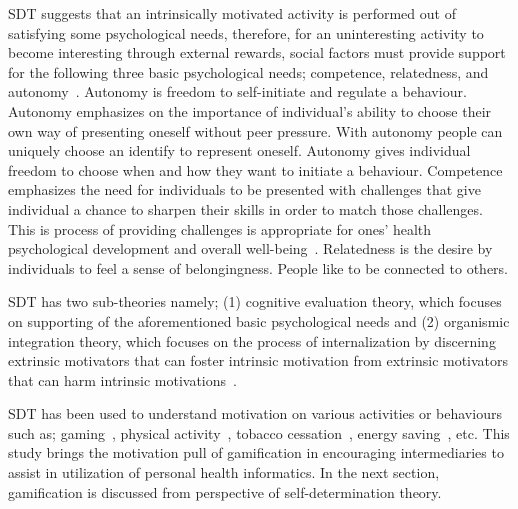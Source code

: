 SDT suggests that an intrinsically motivated activity is performed out of satisfying some psychological needs, therefore, for an uninteresting activity to become interesting through external rewards, social factors must provide support for the following three basic psychological needs; competence, relatedness, and autonomy~\citep{ryan2000intrinsic}. Autonomy is freedom to self-initiate and regulate a behaviour. Autonomy emphasizes on the importance of individual's ability to choose their own way of presenting oneself without peer pressure. With autonomy people can uniquely choose an identify to represent oneself. Autonomy gives individual freedom to choose when and how they want to initiate a behaviour. Competence emphasizes the need for individuals to be presented with challenges that give individual a chance to sharpen their skills in order to match those challenges. This is process of providing challenges is appropriate for ones' health psychological development and  overall well-being~\citep{zhang2008motivational}. Relatedness is the desire by individuals to feel a sense of belongingness. People like to be connected to others.

SDT has two sub-theories namely; (1) cognitive evaluation theory, which focuses on supporting of the aforementioned basic psychological needs and (2) organismic integration theory, which focuses on the process of internalization by discerning extrinsic motivators that can foster intrinsic motivation from extrinsic motivators that can harm intrinsic motivations~\citep{ryan2000:self,lee2015:relating}.

SDT has been used to understand motivation on various activities or behaviours such as; gaming~\citep{ryan2006:motivationalpull}, physical activity~\citep{power2011:obesity}, tobacco cessation~\citep{williams2006:testing}, energy saving~\citep{webb2013:self}, etc. This study brings the motivation pull of gamification in encouraging intermediaries to assist in utilization of personal health informatics. In the next section, gamification is discussed from perspective of self-determination theory.
